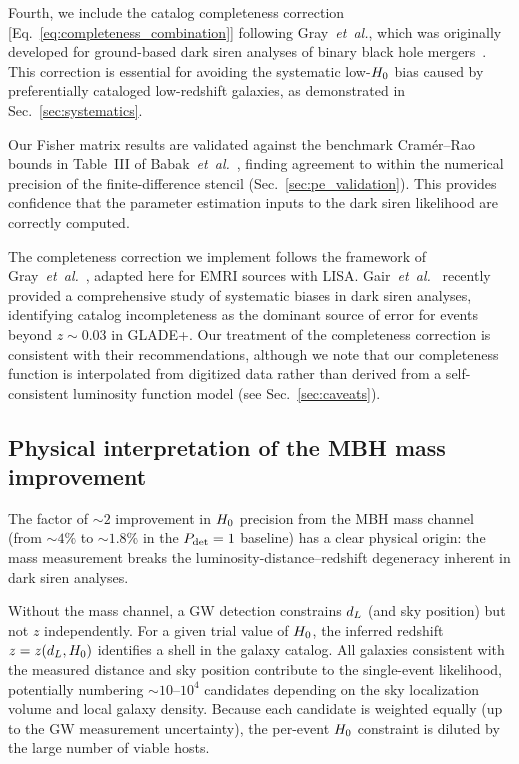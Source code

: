 Fourth, we include the catalog completeness correction
[Eq.~\eqref{eq:completeness_combination}] following Gray~\emph{et~al.},
which was originally developed for ground-based dark siren analyses of
binary black hole mergers~\cite{Gray:2019ksv}.  This correction is
essential for avoiding the systematic low-$H_0$ bias caused by
preferentially cataloged low-redshift galaxies, as demonstrated in
Sec.~\ref{sec:systematics}.

Our Fisher matrix results are validated against the benchmark
Cram\'{e}r--Rao bounds in Table~III of
Babak~\emph{et~al.}~\cite{Babak:2017tow}, finding agreement to within
the numerical precision of the finite-difference stencil
(Sec.~\ref{sec:pe_validation}).  This provides confidence that the
parameter estimation inputs to the dark siren likelihood are correctly
computed.

The completeness correction we implement follows the framework of
Gray~\emph{et~al.}~\cite{Gray:2019ksv}, adapted here for EMRI sources
with LISA.  Gair~\emph{et~al.}~\cite{Gair:2022zsa} recently provided a
comprehensive study of systematic biases in dark siren analyses,
identifying catalog incompleteness as the dominant source of error for
events beyond $z \sim 0.03$ in GLADE+.  Our treatment of the
completeness correction is consistent with their recommendations,
although we note that our completeness function is interpolated from
digitized data rather than derived from a self-consistent luminosity
function model (see Sec.~\ref{sec:caveats}).

\subsection{Physical interpretation of the MBH mass improvement}
\label{sec:mass_interpretation}

The factor of $\sim 2$ improvement in $H_0$ precision from the MBH mass
channel (from $\sim 4\%$ to $\sim 1.8\%$ in the $P_\mathrm{det} = 1$ baseline)
has a clear physical origin: the mass measurement breaks the
luminosity-distance--redshift degeneracy inherent in dark siren analyses.

Without the mass channel, a GW detection constrains $d_L$ (and sky
position) but not $z$ independently.  For a given trial value of $H_0$,
the inferred redshift $z = z(d_L, H_0)$ identifies a shell in the galaxy
catalog.  All galaxies consistent with the measured distance and sky
position contribute to the single-event likelihood, potentially
numbering $\sim 10$--$10^4$ candidates depending on the sky
localization volume and local galaxy density.  Because each candidate is
weighted equally (up to the GW measurement uncertainty), the per-event
$H_0$ constraint is diluted by the large number of viable hosts.

